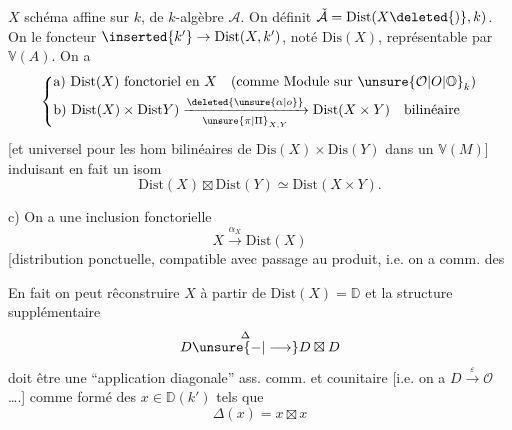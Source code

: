  $X$ schéma affine sur $k$,  de $k$-algèbre $\mathcal A$. On définit $\check{\mathcal A}=\mathrm{Dist}(X\deleted{)},k)$. On  le foncteur $\inserted{k'}\rightarrow\mathrm{Dist}(X,k')$, noté $\mathrm{Dis}(X)$, représentable par $\mathbb V(A)$. On a
\reversemarginpar{}\normalmarginpar
\[
\left\{\begin{aligned}
&\text{a)}\ \mathrm{Dist}(X)\ \text{fonctoriel en }X\quad
  (\text{comme Module sur }\unsure{\mathcal O|O|\mathbb O}_k)\\
&\text{b)}\ \mathrm{Dist}(X)\times\mathrm{Dist}Y)
  \xrightarrow[\unsure{\pi|\Pi}_{X,Y}]{\deleted{\unsure{\alpha|o}}}
  \mathrm{Dist}(X\times Y)\quad\text{bilinéaire}
\end{aligned}\right.
\]
[et universel pour les hom bilinéaires de $\mathrm{Dis}(X)\times\mathrm{Dis}(Y)$ dans un $\mathbb V(M)$] induisant en fait un isom
\[
\mathrm{Dist}(X)\boxtimes\mathrm{Dist}(Y)\simeq\mathrm{Dist}(X\times Y).
\]

c) On a une inclusion fonctorielle
\[
X\xrightarrow{\alpha_X}\mathrm{Dist}(X)
\]
[distribution ponctuelle, compatible avec passage au produit, i.e. on a comm. des

 En fait on peut rêconstruire $X$ à partir de $\mathrm{Dist}(X)=\mathbb D$ et la structure supplémentaire
\[
D\overset{\Delta}{\unsure{\mathbin{-}|\longrightarrow}}D\boxtimes D
\]
\reversemarginpar{}\normalmarginpar
doit être une ``application diagonale'' ass. comm. et counitaire [i.e. on a $D\xrightarrow{\varepsilon}\mathcal O$ \ldots.] comme formé des  $x\in\mathbb D(k')$ tels que
\[
\boxed{\Delta(x)=x\boxtimes x}
\]

